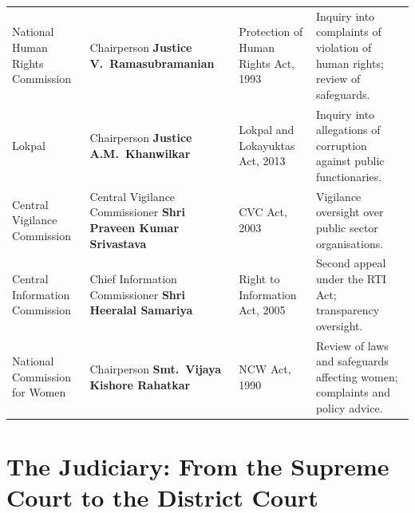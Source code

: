 \documentclass[12pt,a4paper,openany]{report}
\begin{document}
{\begin{longtable}{@{}>{\raggedright\arraybackslash}p{3.5cm} >{\raggedright\arraybackslash}p{4.6cm} >{\raggedright\arraybackslash}p{2.2cm} >{\raggedright\arraybackslash}p{4.3cm}@{}}
\addlinespace[2pt]
National Human Rights Commission & Chairperson \textbf{Justice V.\ Ramasubramanian} & Protection of Human Rights Act, 1993 & Inquiry into complaints of violation of human rights; review of safeguards. \\
\addlinespace[2pt]
Lokpal & Chairperson \textbf{Justice A.M.\ Khanwilkar} & Lokpal and Lokayuktas Act, 2013 & Inquiry into allegations of corruption against public functionaries. \\
\addlinespace[2pt]
Central Vigilance Commission & Central Vigilance Commissioner \textbf{Shri Praveen Kumar Srivastava} & CVC Act, 2003 & Vigilance oversight over public sector organisations. \\
\addlinespace[2pt]
Central Information Commission & Chief Information Commissioner \textbf{Shri Heeralal Samariya} & Right to Information Act, 2005 & Second appeal under the RTI Act; transparency oversight. \\
\addlinespace[2pt]
National Commission for Women & Chairperson \textbf{Smt.\ Vijaya Kishore Rahatkar} & NCW Act, 1990 & Review of laws and safeguards affecting women; complaints and policy advice. \\
\bottomrule
\end{longtable}}

\vspace{3pt}

\newpage
\section*{The Judiciary: From the Supreme Court to the District Court}
\end{document}

